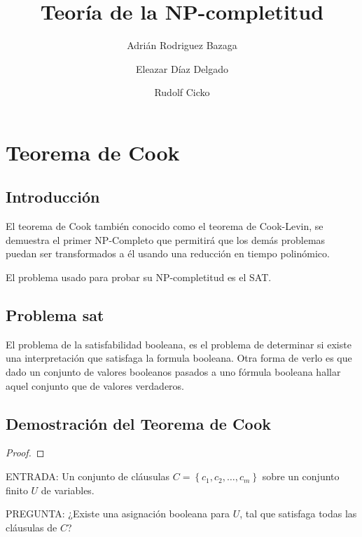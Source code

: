 \documentclass[11pt, a4paper]{memoir}
\title{\Huge Teoría de la NP-completitud}
\author{Adrián Rodriguez Bazaga}
\author{Eleazar Díaz Delgado}
\author{Rudolf Cicko}
\affil{Departamento de Ingeniería Informática y de Sistemas. Universidad de La Laguna}
\begin{document}
\maketitle

\chapter{Teorema de Cook}

\section{Introducción}


El teorema de Cook también conocido como el teorema de Cook-Levin, se demuestra
el primer NP-Completo que permitirá que los demás problemas puedan ser
transformados a él usando una reducción en tiempo polinómico.

El problema usado para probar su NP-completitud es el \gls{SAT}.

\section{Problema \gls{sat}}


El problema de la satisfabilidad booleana, es el problema de determinar si
existe una interpretación que satisfaga la formula booleana. Otra forma de verlo
es que dado un conjunto de valores booleanos pasados a uno fórmula booleana
hallar aquel conjunto que de valores verdaderos.

\section{Demostración del Teorema de Cook}



\begin{proof}


\end{proof}

\noindent ENTRADA: Un conjunto de cláusulas $C=\left \{c_1, c_2, \dots, c_m \right \}$ sobre un conjunto finito $U$ de variables.

\noindent PREGUNTA: ¿Existe una asignación booleana para $U$, tal que satisfaga todas las cláusulas de $C$?
\end{document}
